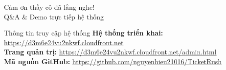 \documentclass[aspectratio=169,11pt]{beamer}
\begin{document}
\begin{frame}
  \centering
  \vspace*{0.8cm}
  {\Huge\color{uetblue} Cảm ơn thầy cô đã lắng nghe!}\\[0.5cm]
  {\large Q\&A \& Demo trực tiếp hệ thống}\\[0.7cm]
  \begin{block}{Thông tin truy cập hệ thống}
    \centering\small
    \textbf{Hệ thống triển khai:} \url{https://d3m6e24vu2nkwf.cloudfront.net}\\[4pt]
    \textbf{Trang quản trị:} \url{https://d3m6e24vu2nkwf.cloudfront.net/admin.html}\\[4pt]
    \textbf{Mã nguồn GitHub:} \url{https://github.com/nguyenhieu21016/TicketRush}
  \end{block}
\end{frame}
\end{document}

